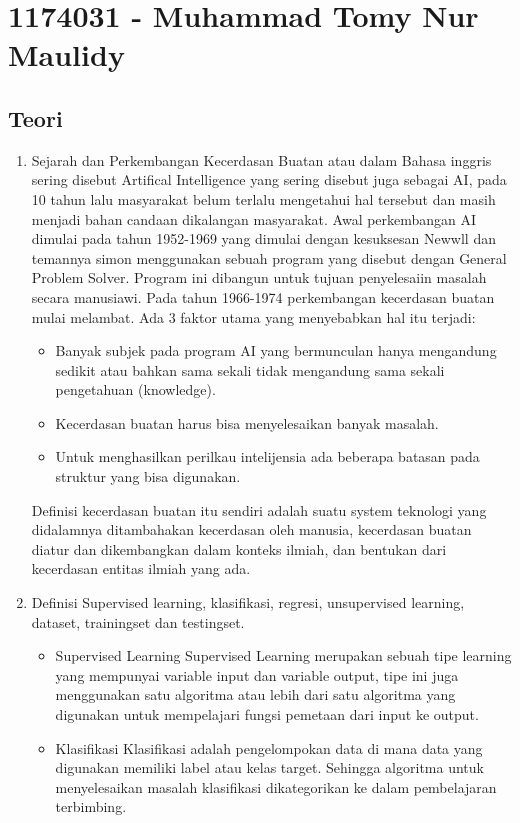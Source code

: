 \section{1174031 - Muhammad Tomy Nur Maulidy}
\subsection{Teori}
\begin{enumerate}
	\item Sejarah dan Perkembangan
	\hfill\break
	Kecerdasan Buatan atau dalam Bahasa inggris sering disebut Artifical Intelligence yang sering disebut juga sebagai AI, pada 10 tahun lalu masyarakat belum terlalu mengetahui hal tersebut dan masih menjadi bahan candaan dikalangan masyarakat. Awal perkembangan AI dimulai pada tahun 1952-1969 yang dimulai dengan kesuksesan Newwll dan temannya simon menggunakan sebuah program yang disebut dengan General Problem Solver. Program ini dibangun untuk tujuan penyelesaiin masalah secara manusiawi. Pada tahun 1966-1974 perkembangan kecerdasan buatan mulai melambat. Ada 3 faktor utama yang menyebabkan hal itu terjadi:
	\begin{itemize}
		\item Banyak subjek pada program AI yang bermunculan hanya mengandung sedikit atau bahkan sama sekali tidak  mengandung sama sekali pengetahuan (knowledge).
		\item Kecerdasan buatan harus bisa menyelesaikan banyak masalah.
		\item Untuk menghasilkan perilkau intelijensia ada beberapa batasan pada struktur yang bisa digunakan.
	\end{itemize}
	Definisi kecerdasan buatan itu sendiri adalah suatu system teknologi yang didalamnya ditambahakan kecerdasan oleh manusia, kecerdasan buatan diatur dan dikembangkan dalam konteks ilmiah, dan bentukan dari kecerdasan entitas ilmiah yang ada.
	\item Definisi
	\hfill\break
	Supervised learning, klasifikasi, regresi, unsupervised learning, dataset, trainingset dan testingset.
	\begin{itemize}
		\item Supervised Learning
		\hfill\break
		Supervised Learning merupakan sebuah tipe learning yang mempunyai variable input dan variable output, tipe ini juga menggunakan satu algoritma atau lebih dari satu algoritma yang digunakan untuk mempelajari fungsi  pemetaan dari input ke output.
		\item Klasifikasi
		\hfill\break
		Klasifikasi adalah pengelompokan data di mana data yang digunakan memiliki label atau kelas target. Sehingga algoritma untuk menyelesaikan masalah klasifikasi dikategorikan ke dalam pembelajaran terbimbing.

\end{itemize}
\end{enumerate}
